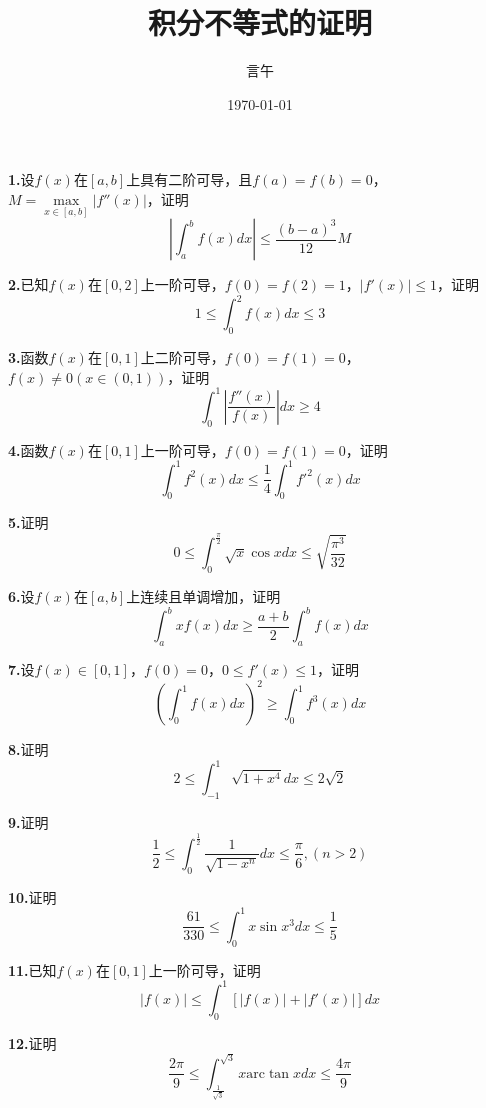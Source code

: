 \documentclass[10pt]{article}
\title{积分不等式的证明}
\author{言午}
\date{\today}
\begin{document}
\maketitle

\textbf{1.}设$f\left( x \right)$在$\left[ a,b \right]$上具有二阶可导，且$f\left( a \right) =f\left( b \right) =0$，$M=\mathop {\max} \limits_{x\in \left[ a,b \right]}\left| f''\left( x \right) \right|$，证明
$$
\left| \int_a^b{f\left( x \right) dx} \right|\le \frac{\left( b-a \right) ^3}{12}M
$$

\textbf{2.}已知$f\left( x \right)$在$\left[ 0,2 \right]$上一阶可导，$f\left( 0 \right) =f\left( 2 \right) =1$，$\left| f'\left( x \right) \right|\le 1$，证明
$$
1\le \int_0^2{f\left( x \right) dx}\le 3
$$

\textbf{3.}函数$f\left( x \right)$在$\left[ 0,1 \right]$上二阶可导，$f\left( 0 \right) =f\left( 1 \right) =0$，$f\left( x \right) \ne 0\left( x\in \left( 0,1 \right) \right)$，证明
$$
\int_0^1{\left| \frac{f''\left( x \right)}{f\left( x \right)} \right|dx}\ge 4
$$

\textbf{4.}函数$f\left( x \right)$在$\left[ 0,1 \right]$上一阶可导，$f\left( 0 \right) =f\left( 1 \right) =0$，证明
$$
\int_0^1{f^2\left( x \right) dx}\le \frac{1}{4}\int_0^1{f'^2\left( x \right) dx}
$$

\textbf{5.}证明
$$
0\le \int_0^{\frac{\pi}{2}}{\sqrt{x}\cos xdx}\le \sqrt{\frac{\pi ^3}{32}}
$$

\textbf{6.}设$f\left( x \right)$在$\left[ a,b \right]$上连续且单调增加，证明
$$
\int_a^b{xf\left( x \right) dx}\ge \frac{a+b}{2}\int_a^b{f\left( x \right) dx}
$$

\textbf{7.}设$f\left( x \right) \in \left[ 0,1 \right]$，$f\left( 0 \right) =0$，$0\le f'\left( x \right) \le 1$，证明
$$
\left( \int_0^1{f\left( x \right) dx} \right) ^2\ge \int_0^1{f^3\left( x \right) dx}
$$

\textbf{8.}证明
$$
2\le \int_{-1}^1{\sqrt{1+x^4}dx}\le 2\sqrt{2}
$$

\textbf{9.}证明
$$
\frac{1}{2}\le \int_0^{\frac{1}{2}}{\frac{1}{\sqrt{1-x^n}}dx}\le \frac{\pi}{6},\left( n>2 \right)
$$

\textbf{10.}证明
$$
\frac{61}{330}\le \int_0^1{x\sin x^3dx}\le \frac{1}{5}
$$

\textbf{11.}已知$f\left( x \right)$在$\left[ 0,1 \right]$上一阶可导，证明
$$
\left| f\left( x \right) \right|\le \int_0^1{\left[ \left| f\left( x \right) \right|+\left| f'\left( x \right) \right| \right] dx}
$$

\textbf{12.}证明
$$
\frac{2\pi}{9}\le \int_{\frac{1}{\sqrt{3}}}^{\sqrt{3}}{x\text{arc}\tan xdx}\le \frac{4\pi}{9}
$$
\end{document}
